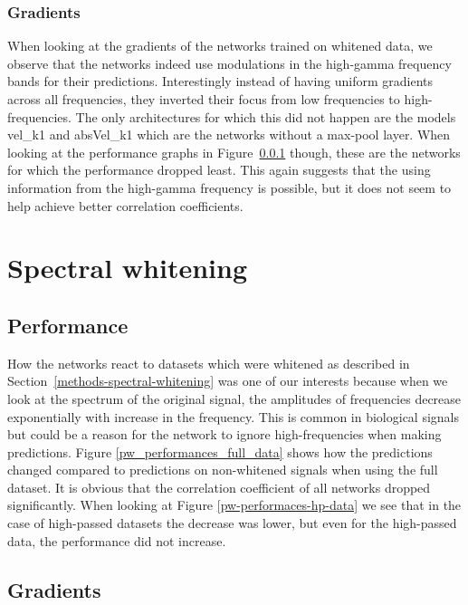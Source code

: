\subsubsection{Gradients}
When looking at the gradients of the networks trained on whitened data, we observe that the networks indeed use modulations in the high-gamma frequency bands for their predictions.
Interestingly instead of having uniform gradients across all frequencies, they inverted their focus from low frequencies to high-frequencies.
The only architectures for which this did not happen are the models vel\_k1 and absVel\_k1 which are the networks without a max-pool layer.
When looking at the performance graphs in Figure~\ref{} though, these are the networks for which the performance dropped least.
This again suggests that the using information from the high-gamma frequency is possible, but it does not seem to help achieve better correlation coefficients.

\section{Spectral whitening}\label{sec:spectral-whitening}

\subsection{Performance}\label{subsec:pw-performance}
How the networks react to datasets which were whitened as described in Section~\ref{methods-spectral-whitening} was one of our interests because when we look at the spectrum of the original signal, the amplitudes of frequencies decrease exponentially with increase in the frequency.
This is common in biological signals but could be a reason for the network to ignore high-frequencies when making predictions. Figure \ref{pw_performances_full_data} shows how the predictions changed compared to predictions on non-whitened signals when using the full dataset.
It is obvious that the correlation coefficient of all networks dropped significantly. When looking at Figure \ref{pw-performaces-hp-data} we see that in the case of high-passed datasets the decrease was lower, but even for the high-passed data, the performance did not increase.

\subsection{Gradients}\label{subsec:pw-gradients2}